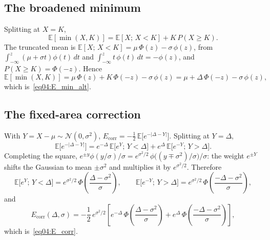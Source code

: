 \documentclass[11pt,letterpaper]{article}
\theoremstyle{plain}
\theoremstyle{definition}
\theoremstyle{remark}
\begin{document}
\subsection{The broadened minimum}
\label{subsecC:broadened_min}

Splitting at $X = K$,
\begin{equation}
\label{eqC:min_split}
\mathbb{E}[\min(X, K)] = \mathbb{E}[X;\, X < K] + K\, P(X \ge K) .
\end{equation}
The truncated mean is $\mathbb{E}[X;\, X < K] = \mu\,\Phi(z) - \sigma\,\phi(z)$, from $\int_{-\infty}^{z} (\mu + \sigma t)\phi(t)\,dt$ and $\int_{-\infty}^{z} t\,\phi(t)\,dt = -\phi(z)$, and $P(X \ge K) = \Phi(-z)$. Hence
\begin{equation}
\label{eqC:min_final}
\mathbb{E}[\min(X, K)] = \mu\,\Phi(z) + K\,\Phi(-z) - \sigma\,\phi(z) = \mu + \Delta\,\Phi(-z) - \sigma\,\phi(z),
\end{equation}
which is~\eqref{eq04:E_min_alt}.

\subsection{The fixed-area correction}
\label{subsecC:pssy_correction}

With $Y = X - \mu \sim \mathcal{N}(0, \sigma^2)$, $E_{\mathrm{corr}} = -\tfrac12\,\mathbb{E}\big[e^{-|\Delta - Y|}\big]$. Splitting at $Y = \Delta$,
\begin{equation}
\label{eqC:ecorr_split}
\mathbb{E}\big[e^{-|\Delta - Y|}\big] = e^{-\Delta}\,\mathbb{E}\big[e^{Y};\, Y < \Delta\big] + e^{\Delta}\,\mathbb{E}\big[e^{-Y};\, Y > \Delta\big].
\end{equation}
Completing the square, $e^{\pm y}\phi(y/\sigma)/\sigma = e^{\sigma^2/2}\,\phi\big((y \mp \sigma^2)/\sigma\big)/\sigma$: the weight $e^{\pm Y}$ shifts the Gaussian to mean $\pm\sigma^2$ and multiplies it by $e^{\sigma^2/2}$. Therefore
\begin{equation}
\mathbb{E}\big[e^{Y};\, Y < \Delta\big] = e^{\sigma^2/2}\,\Phi\!\left(\frac{\Delta - \sigma^2}{\sigma}\right), \qquad
\mathbb{E}\big[e^{-Y};\, Y > \Delta\big] = e^{\sigma^2/2}\,\Phi\!\left(\frac{-\Delta - \sigma^2}{\sigma}\right),
\end{equation}
and
\begin{equation}
\label{eqC:ecorr_final}
E_{\mathrm{corr}}(\Delta, \sigma) = -\frac12\, e^{\sigma^2/2}\left[e^{-\Delta}\,\Phi\!\left(\frac{\Delta - \sigma^2}{\sigma}\right) + e^{\Delta}\,\Phi\!\left(\frac{-\Delta - \sigma^2}{\sigma}\right)\right],
\end{equation}
which is~\eqref{eq04:E_corr}.
\end{document}
